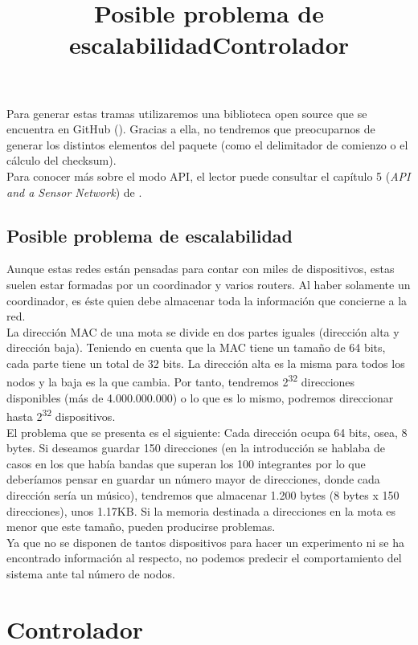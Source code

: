 Para generar estas tramas utilizaremos una biblioteca open source que se encuentra en GitHub (\cite{libraryArduinoXBee}).
Gracias a ella, no tendremos que preocuparnos de generar los distintos elementos del paquete
(como el delimitador de comienzo o el cálculo del checksum).\\

Para conocer más sobre el modo API, el lector puede consultar el capítulo 5 (\textit{API and a Sensor Network}) de \cite{faludi}.\\

\subsection{Posible problema de escalabilidad}
\title{Posible problema de escalabilidad}

Aunque estas redes están pensadas para contar con miles de dispositivos,
estas suelen estar formadas por un coordinador y varios routers.
Al haber solamente un coordinador, es éste quien debe almacenar
toda la información que concierne a la red.\\

La dirección MAC de una mota se divide en dos partes iguales (dirección alta y dirección baja).
Teniendo en cuenta que la MAC tiene un tamaño de 64 bits, cada parte tiene un total de 32 bits.
La dirección alta es la misma para todos los nodos y la baja es la que cambia. Por tanto, tendremos 2\textsuperscript{32} direcciones
disponibles (más de 4.000.000.000) o lo que es lo mismo, podremos direccionar hasta 2\textsuperscript{32} dispositivos.\\

El problema que se presenta es el siguiente: Cada dirección ocupa 64 bits, osea, 8 bytes. Si deseamos guardar 150
direcciones (en la introducción se hablaba de casos en los que había bandas que superan los 100 integrantes por lo que
deberíamos pensar en guardar un número mayor de direcciones, donde cada dirección sería un músico), tendremos que almacenar
1.200 bytes (8 bytes x 150 direcciones), unos 1.17KB. Si la memoria destinada a direcciones en la mota es menor que este tamaño,
pueden producirse problemas.\\

Ya que no se disponen de tantos dispositivos para hacer un experimento ni se ha encontrado información al respecto,
no podemos predecir el comportamiento del sistema ante tal número de nodos.\\

\section{Controlador}
\title{Controlador}

